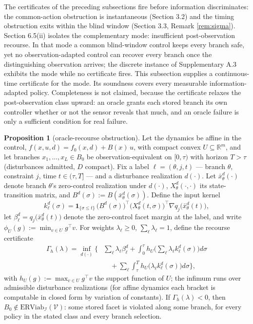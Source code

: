 \documentclass[10pt,twocolumn]{article}
\theoremstyle{definition}
\newtheorem{proposition}{Proposition}
\begin{document}
The certificates of the preceding subsections fire before information discriminates: the
common-action obstruction is instantaneous (Section 3.2) and the timing
obstruction exits within the blind window (Section 3.3, Remark
\ref{rem:sigma}). Section 6.5(ii) isolates the complementary mode:
insufficient post-observation recourse. In that mode a common blind-window
control keeps every branch safe, yet no observation-adapted control can
recover every branch once the distinguishing observation arrives; the discrete
instance of Supplementary A.3 exhibits the mode while no certificate fires.
This subsection supplies a continuous-time certificate for the mode. Its
soundness covers every measurable information-adapted policy. Completeness is
not claimed, because the certificate relaxes the post-observation class
upward: an oracle grants each stored branch its own controller whether or not
the sensor reveals that much, and an oracle failure is only a sufficient
condition for real failure.

\begin{proposition}[oracle-recourse obstruction]\label{prop:recourse}
Let the dynamics be affine in the control,
\(f(x,u,d) = f_0(x,d) + B(x)\,u\), with compact convex
\(U \subseteq \mathbb{R}^m\), and let branches
\(x_1, \dots, x_L \in B_0\) be observation-equivalent on \([0, \tau)\) with
horizon \(T > \tau\) (disturbances admitted, \(D\) compact). Fix a label
\(\ell = (\theta, j, t)\) --- branch \(\theta\), constraint \(j\), time
\(t \in (\tau, T]\) --- and a disturbance realization \(d(\cdot)\). Let
\(\bar x_\theta^d(\cdot)\) denote branch \(\theta\)'s zero-control
realization under \(d(\cdot)\), \(X_\theta^d(\cdot, \cdot)\) its
state-transition matrix, and \(B^d(\sigma) := B(\bar x_\theta^d(\sigma))\).
Define the input kernel
\[k_\ell^d(\sigma) = \mathbf{1}_{\{\sigma \le t\}}\,
\big(B^d(\sigma)\big)^{\top}
\big(X_\theta^d(t, \sigma)\big)^{\top}
\nabla q_j\big(\bar x_\theta^d(t)\big),\]
let \(\beta_\ell^d = q_j\big(\bar x_\theta^d(t)\big)\) denote the
zero-control facet margin at the label, and write
\(\phi_U(g) := \min_{v \in U} g^{\top} v\). For weights
\(\lambda_\ell \ge 0\), \(\sum_\ell \lambda_\ell = 1\), define the recourse certificate \[\begin{aligned} \Gamma_{h}(\lambda) = \inf_{d(\cdot)} \Big\{ &\sum_{\ell} \lambda_{\ell} \beta_{\ell}^{d} + \int_0^{\tau} h_U\Big(\sum_{\ell} \lambda_\ell k_\ell^d(\sigma)\Big) d\sigma \\ &\quad + \sum_{\ell} \int_{\tau}^{T} h_U\big(\lambda_\ell k_\ell^d(\sigma)\big) d\sigma \Big\}, \end{aligned}\] with \(h_U(g) := \max_{v \in U} g^{\top} v\) the support function of \(U\); the infimum runs over admissible disturbance realizations (for affine dynamics each bracket is computable in closed form by variation of constants). If \(\Gamma_{h}(\lambda) < 0\), then \(B_0 \notin \mathrm{ERViab}_{\mathcal{I}}(\mathcal{V})\): some stored facet is violated along some branch, for every policy in the stated class and every branch selection.
\end{proposition}
\end{document}
